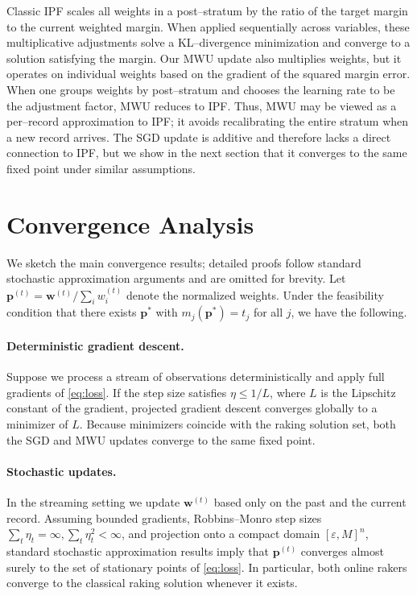\documentclass[12pt, letterpaper]{article}
\begin{document}
Classic IPF scales all weights in a post–stratum by the ratio of the
target margin to the current weighted margin.  When applied
sequentially across variables, these multiplicative adjustments solve a
KL--divergence minimization and converge to a solution satisfying the
margin.  Our MWU update also multiplies weights, but
it operates on individual weights based on the gradient of the squared
margin error.  When one groups weights by post–stratum and chooses the
learning rate to be the adjustment factor, MWU reduces to IPF.  Thus,
MWU may be viewed as a per–record approximation to IPF; it avoids
recalibrating the entire stratum when a new record arrives.  The SGD
update is additive and therefore lacks a direct connection to IPF, but
we show in the next section that it converges to the same fixed point
under similar assumptions.

\section{Convergence Analysis}
\label{sec:analysis}

We sketch the main convergence results; detailed proofs follow
standard stochastic approximation arguments and are omitted for
brevity.  Let \(\mathbf{p}^{(t)} = \mathbf{w}^{(t)} / \sum_i w_i^{(t)}\)
denote the normalized weights.  Under the feasibility condition that
there exists \(\mathbf{p}^*\) with \(m_j(\mathbf{p}^*)=t_j\) for all
\(j\), we have the following.

\paragraph{Deterministic gradient descent.}  Suppose we process a
stream of observations deterministically and apply full gradients of
\eqref{eq:loss}.  If the step size satisfies \(\eta\le 1/L\), where
\(L\) is the Lipschitz constant of the gradient, projected gradient
descent converges globally to a minimizer of \(L\).  Because
minimizers coincide with the raking solution set, both the SGD and
MWU updates converge to the same fixed point.

\paragraph{Stochastic updates.}  In the streaming setting we update
\(\mathbf{w}^{(t)}\) based only on the past and the current record.
Assuming bounded gradients, Robbins–Monro step sizes
\(\sum_t \eta_t=\infty, \sum_t \eta_t^2<\infty\), and projection
onto a compact domain \([\varepsilon,M]^n\), standard stochastic
approximation results imply that \(\mathbf{p}^{(t)}\) converges almost
surely to the set of stationary points of \eqref{eq:loss}.  In
particular, both online rakers converge to the classical raking
solution whenever it exists.
\end{document}

